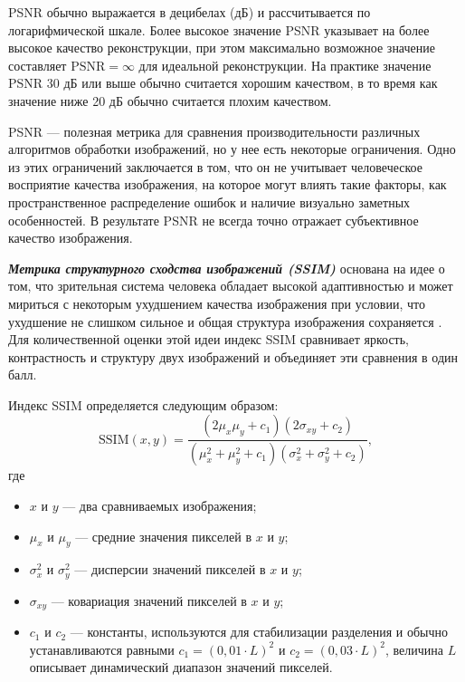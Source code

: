 PSNR обычно выражается в децибелах (дБ) и рассчитывается по логарифмической шкале. Более высокое значение PSNR указывает на более высокое качество реконструкции, при этом максимально возможное значение составляет $\text{PSNR} = \infty$ для идеальной реконструкции. На практике значение PSNR 30 дБ или выше обычно считается хорошим качеством, в то время как значение ниже 20 дБ обычно считается плохим качеством.

PSNR --- полезная метрика для сравнения производительности различных алгоритмов обработки изображений, но у нее есть некоторые ограничения. Одно из этих ограничений заключается в том, что он не учитывает человеческое восприятие качества изображения, на которое могут влиять такие факторы, как пространственное распределение ошибок и наличие визуально заметных особенностей. В результате PSNR не всегда точно отражает субъективное качество изображения.

\textbf{\textit{Метрика структурного сходства изображений (SSIM)}} основана на идее  о том, что зрительная система человека обладает высокой адаптивностью и может мириться с некоторым ухудшением качества изображения при условии, что ухудшение не слишком сильное и общая структура изображения сохраняется \cite{metrics}. Для количественной оценки этой идеи индекс SSIM сравнивает яркость, контрастность и структуру двух изображений и объединяет эти сравнения в один балл.

Индекс SSIM определяется следующим образом:
\begin{equation}
    \text{SSIM}(x, y) = \frac{(2\mu_x\mu_y + c_1)(2\sigma_{xy} + c_2)}{(\mu_x^2 + \mu_y^2 + c_1)(\sigma_x^2 + \sigma_y^2 + c_2)},
\end{equation}
где
\begin{itemize}
    \item $x$ и $y$ --- два сравниваемых изображения;
    \item $\mu_x$ и $\mu_y$ --- средние значения пикселей в $x$ и $y$;
    \item $\sigma_x^2$ и $\sigma_y^2$ --- дисперсии значений пикселей в $x$ и $y$;
    \item $\sigma_{xy}$ --- ковариация значений пикселей в $x$ и $y$;
    \item $c_1$ и $c_2$ --- константы, используются для стабилизации разделения и обычно устанавливаются равными $c_1 = (0,01\cdot L)^2$ и $c_2 = (0,03\cdot L)^2$, величина $L$ описывает динамический диапазон значений пикселей.
\end{itemize}


